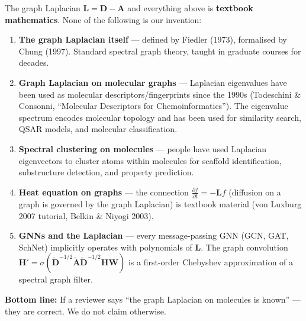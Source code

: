 \documentclass[12pt,a4paper]{article}
\begin{document}
\begin{tcolorbox}[
  colback=gray!5, colframe=gray!60!black,
  fonttitle=\bfseries\large, title={What is NOT new (established prior work)},
  top=3mm, bottom=3mm
]
The graph Laplacian $\bm{L} = \bm{D} - \bm{A}$ and everything above is \textbf{textbook mathematics}. None of the following is our invention:

\begin{enumerate}[leftmargin=*, itemsep=4pt]
  \item \textbf{The graph Laplacian itself} --- defined by Fiedler (1973), formalised by Chung (1997). Standard spectral graph theory, taught in graduate courses for decades.

  \item \textbf{Graph Laplacian on molecular graphs} --- Laplacian eigenvalues have been used as molecular descriptors/fingerprints since the 1990s (Todeschini \& Consonni, ``Molecular Descriptors for Chemoinformatics''). The eigenvalue spectrum encodes molecular topology and has been used for similarity search, QSAR models, and molecular classification.

  \item \textbf{Spectral clustering on molecules} --- people have used Laplacian eigenvectors to cluster atoms within molecules for scaffold identification, substructure detection, and property prediction.

  \item \textbf{Heat equation on graphs} --- the connection $\frac{\partial f}{\partial t} = -\bm{L}f$ (diffusion on a graph is governed by the graph Laplacian) is textbook material (von Luxburg 2007 tutorial, Belkin \& Niyogi 2003).

  \item \textbf{GNNs and the Laplacian} --- every message-passing GNN (GCN, GAT, SchNet) implicitly operates with polynomials of $\bm{L}$. The graph convolution $\bm{H}' = \sigma(\tilde{\bm{D}}^{-1/2}\tilde{\bm{A}}\tilde{\bm{D}}^{-1/2}\bm{H}\bm{W})$ is a first-order Chebyshev approximation of a spectral graph filter.
\end{enumerate}

\textbf{Bottom line:} If a reviewer says ``the graph Laplacian on molecules is known'' --- they are correct. We do not claim otherwise.
\end{tcolorbox}

\vspace{0.8em}
\end{document}
